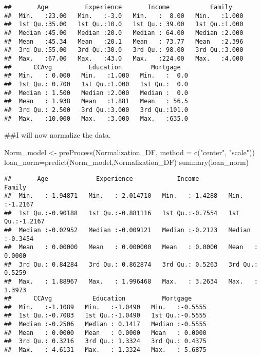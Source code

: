 \documentclass[
]{article}
\newenvironment{Shaded}{\begin{snugshade}}{\end{snugshade}}
\newcommand{\AttributeTok}[1]{\textcolor[rgb]{0.77,0.63,0.00}{#1}}
\newcommand{\FunctionTok}[1]{\textcolor[rgb]{0.00,0.00,0.00}{#1}}
\newcommand{\NormalTok}[1]{#1}
\newcommand{\OtherTok}[1]{\textcolor[rgb]{0.56,0.35,0.01}{#1}}
\newcommand{\StringTok}[1]{\textcolor[rgb]{0.31,0.60,0.02}{#1}}
\begin{document}
\begin{verbatim}
##       Age          Experience       Income           Family     
##  Min.   :23.00   Min.   :-3.0   Min.   :  8.00   Min.   :1.000  
##  1st Qu.:35.00   1st Qu.:10.0   1st Qu.: 39.00   1st Qu.:1.000  
##  Median :45.00   Median :20.0   Median : 64.00   Median :2.000  
##  Mean   :45.34   Mean   :20.1   Mean   : 73.77   Mean   :2.396  
##  3rd Qu.:55.00   3rd Qu.:30.0   3rd Qu.: 98.00   3rd Qu.:3.000  
##  Max.   :67.00   Max.   :43.0   Max.   :224.00   Max.   :4.000  
##      CCAvg          Education        Mortgage    
##  Min.   : 0.000   Min.   :1.000   Min.   :  0.0  
##  1st Qu.: 0.700   1st Qu.:1.000   1st Qu.:  0.0  
##  Median : 1.500   Median :2.000   Median :  0.0  
##  Mean   : 1.938   Mean   :1.881   Mean   : 56.5  
##  3rd Qu.: 2.500   3rd Qu.:3.000   3rd Qu.:101.0  
##  Max.   :10.000   Max.   :3.000   Max.   :635.0
\end{verbatim}

\#\#I will now normalize the data.

\begin{Shaded}
\begin{Highlighting}[]
\NormalTok{Norm\_model }\OtherTok{\textless{}{-}} \FunctionTok{preProcess}\NormalTok{(Normalization\_DF, }
                         \AttributeTok{method =} \FunctionTok{c}\NormalTok{(}\StringTok{"center"}\NormalTok{, }\StringTok{"scale"}\NormalTok{))}
\NormalTok{loan\_norm}\OtherTok{=}\FunctionTok{predict}\NormalTok{(Norm\_model,Normalization\_DF)}
\FunctionTok{summary}\NormalTok{(loan\_norm)}
\end{Highlighting}
\end{Shaded}

\begin{verbatim}
##       Age             Experience            Income            Family       
##  Min.   :-1.94871   Min.   :-2.014710   Min.   :-1.4288   Min.   :-1.2167  
##  1st Qu.:-0.90188   1st Qu.:-0.881116   1st Qu.:-0.7554   1st Qu.:-1.2167  
##  Median :-0.02952   Median :-0.009121   Median :-0.2123   Median :-0.3454  
##  Mean   : 0.00000   Mean   : 0.000000   Mean   : 0.0000   Mean   : 0.0000  
##  3rd Qu.: 0.84284   3rd Qu.: 0.862874   3rd Qu.: 0.5263   3rd Qu.: 0.5259  
##  Max.   : 1.88967   Max.   : 1.996468   Max.   : 3.2634   Max.   : 1.3973  
##      CCAvg           Education          Mortgage      
##  Min.   :-1.1089   Min.   :-1.0490   Min.   :-0.5555  
##  1st Qu.:-0.7083   1st Qu.:-1.0490   1st Qu.:-0.5555  
##  Median :-0.2506   Median : 0.1417   Median :-0.5555  
##  Mean   : 0.0000   Mean   : 0.0000   Mean   : 0.0000  
##  3rd Qu.: 0.3216   3rd Qu.: 1.3324   3rd Qu.: 0.4375  
##  Max.   : 4.6131   Max.   : 1.3324   Max.   : 5.6875
\end{verbatim}
\end{document}
